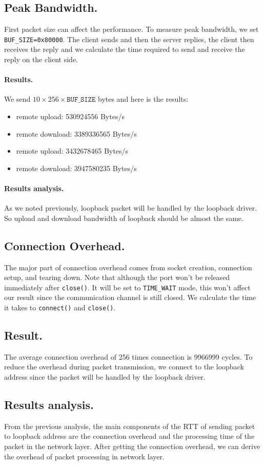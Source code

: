 \subsection{Peak Bandwidth.} 
First packet size can affect the performance. To measure peak bandwidth, we set \texttt{BUF\_SIZE=0x80000}. The client sends and then the server replies, the client then receives the reply and we calculate the time required to send and receive the reply on the client side.

\paragraph{Results.}
We send $10 \times 256 \times \texttt{BUF\_SIZE}$ bytes and here is the results:
\begin{itemize}[leftmargin=*]
	\item remote upload: 530924556 Bytes/s
	\item remote download: 3389336565 Bytes/s
\end{itemize}
\begin{itemize}[leftmargin=*]
	\item remote upload: 3432678465 Bytes/s
	\item remote download: 3947580235 Bytes/s
\end{itemize}
\paragraph{Results analysis.} As we noted previously, loopback packet will be handled by the loopback driver. So upload and download bandwidth of loopback should be almost the same. 

\subsection{Connection Overhead.} The major part of connection overhead comes from socket creation, connection setup, and tearing down. Note that although the port won't be released immediately after \texttt{close()}. It will be set to \texttt{TIME\_WAIT} mode, this won't affect our result since the communication channel is still closed. We calculate the time it takes to \texttt{connect()} and \texttt{close()}.

\subsection{Result.} The average connection overhead of 256 times connection is 9966999 cycles. To reduce the overhead during packet transmission, we connect to the loopback address since the packet will be handled by the loopback driver.

\subsection{Results analysis.} From the previous analysis, the main components of the RTT of sending packet to loopback address are the connection overhead and the processing time of the packet in the network layer. After getting the connection overhead, we can derive the overhead of packet processing in network layer.
